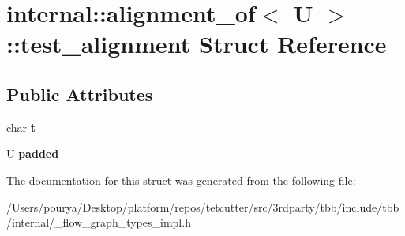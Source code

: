\hypertarget{structinternal_1_1alignment__of_1_1test__alignment}{}\section{internal\+:\+:alignment\+\_\+of$<$ U $>$\+:\+:test\+\_\+alignment Struct Reference}
\label{structinternal_1_1alignment__of_1_1test__alignment}
\subsection*{Public Attributes}
\begin{DoxyCompactItemize}
\item 
\hypertarget{structinternal_1_1alignment__of_1_1test__alignment_af614c64c72d759b586a5e3d6d5593f85}{}char {\bfseries t}\label{structinternal_1_1alignment__of_1_1test__alignment_af614c64c72d759b586a5e3d6d5593f85}

\item 
\hypertarget{structinternal_1_1alignment__of_1_1test__alignment_acd65c3019de2e045116409c2dec931e1}{}U {\bfseries padded}\label{structinternal_1_1alignment__of_1_1test__alignment_acd65c3019de2e045116409c2dec931e1}

\end{DoxyCompactItemize}


The documentation for this struct was generated from the following file\+:\begin{DoxyCompactItemize}
\item 
/\+Users/pourya/\+Desktop/platform/repos/tetcutter/src/3rdparty/tbb/include/tbb/internal/\+\_\+flow\+\_\+graph\+\_\+types\+\_\+impl.\+h\end{DoxyCompactItemize}
